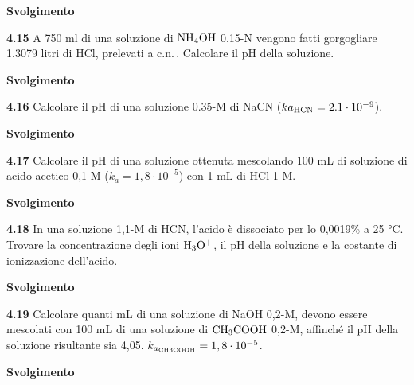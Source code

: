 \vspace{0.2cm}\large\textbf{Svolgimento}\normalsize

\vspace{0.2cm}

\vspace{0.2cm}\textbf{4.15} A 750 ml di una soluzione di $\rm NH_4OH$ 0.15-N vengono fatti gorgogliare 1.3079 litri di HCl, prelevati a c.n.\,. Calcolare il pH della soluzione.

\vspace{0.2cm}\large\textbf{Svolgimento}\normalsize

\vspace{0.2cm}

\vspace{0.2cm}\textbf{4.16} Calcolare il pH di una soluzione 0.35-M di NaCN ($k{a_{\rm HCN}} = 2.1 \cdot 10^{-9}$).

\vspace{0.2cm}\large\textbf{Svolgimento}\normalsize

\vspace{0.2cm}

\vspace{0.2cm}\textbf{4.17} Calcolare il pH di una soluzione ottenuta mescolando 100 mL di soluzione di acido acetico 0,1-M ($k_a = 1,8 \cdot 10^{-5}$) con 1 mL di HCl 1-M.

\vspace{0.2cm}\large\textbf{Svolgimento}\normalsize

\vspace{0.2cm}

\vspace{0.2cm}\textbf{4.18}  In una soluzione 1,1-M di HCN, l’acido è dissociato per lo 0,0019\% a 25 °C. Trovare la concentrazione degli ioni $\rm H_3O^+$, il pH della soluzione e la costante di ionizzazione dell’acido. 

\vspace{0.2cm}\large\textbf{Svolgimento}\normalsize

\vspace{0.2cm}

\vspace{0.2cm}\textbf{4.19}  Calcolare quanti mL di una soluzione di NaOH 0,2-M, devono essere mescolati con
100 mL di una soluzione di $\rm CH_3COOH$ 0,2-M, affinché il pH della soluzione risultante sia 4,05. $k_{a_{\rm CH3COOH}}= 1,8 \cdot 10^{-5}$.

\vspace{0.2cm}\large\textbf{Svolgimento}\normalsize

